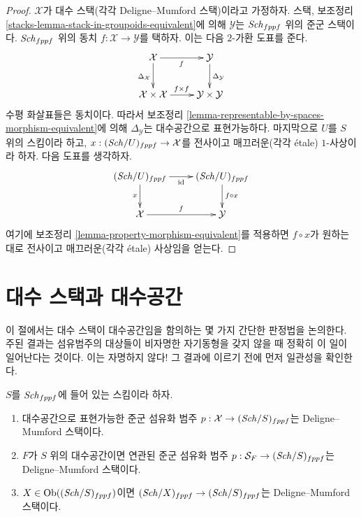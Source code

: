 \begin{proof}
$\mathcal{X}$가 대수 스택(각각 Deligne--Mumford 스택)이라고 가정하자.
스택, 보조정리 \ref{stacks-lemma-stack-in-groupoids-equivalent}에 의해
$\mathcal{Y}$는 $\mathit{Sch}_{fppf}$ 위의 준군 스택이다. $\mathit{Sch}_{fppf}$ 위의
동치 $f : \mathcal{X} \to \mathcal{Y}$를 택하자. 이는 다음 $2$-가환
도표를 준다.
$$
\xymatrix{
\mathcal{X} \ar[r]_f \ar[d]_{\Delta_\mathcal{X}} &
\mathcal{Y} \ar[d]^{\Delta_\mathcal{Y}} \\
\mathcal{X} \times \mathcal{X} \ar[r]^{f \times f} &
\mathcal{Y} \times \mathcal{Y}
}
$$
수평 화살표들은 동치이다. 따라서 보조정리
\ref{lemma-representable-by-spaces-morphism-equivalent}에 의해
$\Delta_\mathcal{Y}$는 대수공간으로 표현가능하다. 마지막으로 $U$를
$S$ 위의 스킴이라 하고, $x : (\mathit{Sch}/U)_{fppf} \to \mathcal{X}$를
전사이고 매끄러운(각각 \'etale) $1$-사상이라 하자. 다음 도표를
생각하자.
$$
\xymatrix{
(\Sch/U)_{fppf} \ar[r]_{\text{id}} \ar[d]_x &
(\Sch/U)_{fppf} \ar[d]^{f \circ x} \\
\mathcal{X} \ar[r]^f &
\mathcal{Y}
}
$$
여기에 보조정리 \ref{lemma-property-morphism-equivalent}를 적용하면
$f \circ x$가 원하는 대로 전사이고 매끄러운(각각 \'etale) 사상임을
얻는다.
\end{proof}




\section{대수 스택과 대수공간}
\label{section-stacks-spaces}

\noindent
이 절에서는 대수 스택이 대수공간임을 함의하는 몇 가지 간단한 판정법을
논의한다. 주된 결과는 섬유범주의 대상들이 비자명한 자기동형을 갖지 않을
때 정확히 이 일이 일어난다는 것이다. 이는 자명하지 않다! 그 결과에
이르기 전에 먼저 일관성을 확인한다.

\begin{lemma}
\label{lemma-representable-algebraic}
$S$를 $\mathit{Sch}_{fppf}$에 들어 있는 스킴이라 하자.
\begin{enumerate}
\item 대수공간으로 표현가능한 준군 섬유화 범주
$p : \mathcal{X} \to (\mathit{Sch}/S)_{fppf}$는 Deligne--Mumford 스택이다.
\item $F$가 $S$ 위의 대수공간이면 연관된 준군 섬유화 범주
$p : \mathcal{S}_F \to (\mathit{Sch}/S)_{fppf}$는 Deligne--Mumford 스택이다.
\item $X \in \mathop{\mathrm{Ob}}\nolimits((\mathit{Sch}/S)_{fppf})$이면
$(\mathit{Sch}/X)_{fppf} \to (\mathit{Sch}/S)_{fppf}$는 Deligne--Mumford 스택이다.
\end{enumerate}
\end{lemma}

